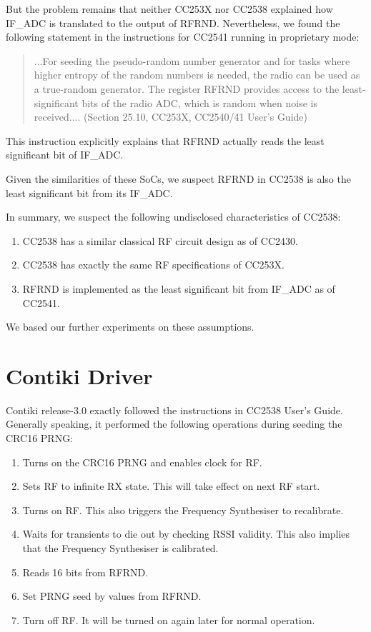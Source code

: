 But the problem remains that neither CC253X nor CC2538 explained how IF\_ADC is translated to the output of RFRND. Nevertheless, we found the following statement in the instructions for CC2541 running in proprietary mode:
\begin{quote}
...For seeding the pseudo-random number generator and for tasks where higher entropy of the random numbers is needed, the radio can be used as a true-random generator. The register RFRND provides access to the least-significant bits of the radio ADC, which is random when noise is received.... (Section 25.10, CC253X, CC2540/41 User's Guide)
\label{CC2540 RND}
\end{quote}

This instruction explicitly explains that RFRND actually reads the least significant bit of IF\_ADC.

Given the similarities of these SoCs, we suspect RFRND in CC2538 is also  the least significant bit from its IF\_ADC.

In summary, we suspect the following undisclosed characteristics of CC2538:
\begin{enumerate}
\item CC2538 has a similar classical RF circuit design as of CC2430.
\item CC2538 has exactly the same RF specifications of CC253X.
\item RFRND is implemented as the least significant bit from IF\_ADC as of CC2541.
\end{enumerate}

We based our further experiments on these assumptions.

\section{Contiki Driver}

Contiki release-3.0 exactly followed the instructions in CC2538 User's Guide. Generally speaking, it performed the following operations during seeding the CRC16 PRNG:
\begin{enumerate}
\item Turns on the CRC16 PRNG and enables clock for RF.
\item Sets RF to infinite RX state. This will take effect on next RF start.
\item Turns on RF. This also triggers the Frequency Synthesiser to recalibrate.
\item Waits for transients to die out by checking RSSI validity. This also implies that the Frequency Synthesiser is calibrated.
\item Reads 16 bits from RFRND.
\item Set PRNG seed by values from RFRND.
\item Turn off RF. It will be turned on again later for normal operation.
\end{enumerate}

